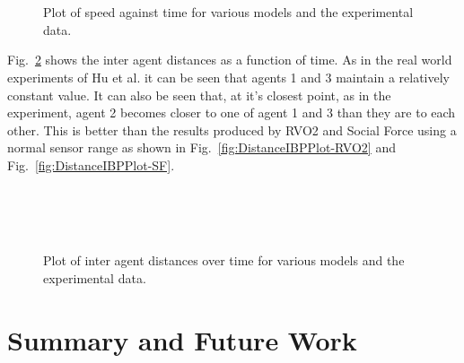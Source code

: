 \begin{figure}[!tb]
  \centering
   \\
   \\
  \caption{Plot of speed against time for various models and the experimental data.}
  \label{fig:SpeedIBPPlot}
\end{figure}

Fig.~\ref{fig:DistanceIBPPlot} shows the inter agent distances as a function of time. As in the real world experiments of Hu et al. it can be seen that agents 1 and 3 maintain a relatively constant value. It can also be seen that, at it's closest point, as in the experiment, agent 2 becomes closer to one of agent 1 and 3 than they are to each other. This is better than the results produced by RVO2 and Social Force using a normal sensor range as shown in Fig.~\ref{fig:DistanceIBPPlot-RVO2} and Fig.~\ref{fig:DistanceIBPPlot-SF}.





\begin{figure}[!tb]
  \centering
  \\
   \\
   \\
  \caption{Plot of inter agent distances over time for various models and the experimental data.}
  \label{fig:DistanceIBPPlot}
\end{figure}


\section{Summary and Future Work}
\label{IBP:Conclusion}

